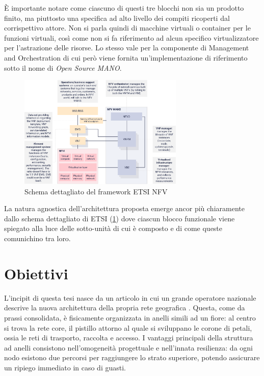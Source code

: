 È importante notare come ciascuno di questi tre blocchi non sia un prodotto finito, ma piuttosto una specifica ad alto livello dei compiti ricoperti dal corrispettivo attore. Non si parla quindi di macchine virtuali o container per le funzioni virtuali, così come non si fa riferimento ad alcun specifico virtualizzatore per l'astrazione delle risorse. Lo stesso vale per la componente di Management and Orchestration di cui però viene fornita un'implementazione di riferimento sotto il nome di \textit{Open Source MANO}.

\begin{figure}[htb]
    \includegraphics[width=0.7\textwidth]{graphics/full_etsi_framework.png}
    \caption{Schema dettagliato del framework ETSI NFV}
    \label{fig:esti-nfv-low-level}
\end{figure}

La natura agnostica dell'architettura proposta emerge ancor più chiaramente dallo schema dettagliato di ETSI (\cref{fig:esti-nfv-low-level}) dove ciascun blocco funzionale viene spiegato alla luce delle sotto-unità di cui è composto e di come queste comunichino tra loro.

\section{Obiettivi}

L'incipit di questa tesi nasce da un articolo in cui un grande operatore nazionale descrive la nuova architettura della propria rete geografica \cite{revolutiontim}. Questa, come da prassi consolidata, è fisicamente organizzata in anelli simili ad un fiore: al centro si trova la rete core, il pistillo attorno al quale si sviluppano le corone di petali, ossia le reti di trasporto, raccolta e accesso. I vantaggi principali della struttura ad anelli consistono nell'omogeneità progettuale e nell'innata resilienza: da ogni nodo esistono due percorsi per raggiungere lo strato superiore, potendo assicurare un ripiego immediato in caso di guasti.

